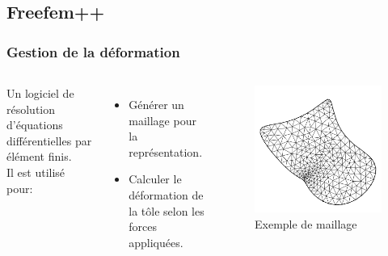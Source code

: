 \documentclass{beamer}
\begin{document}
\subsection{Freefem++}
\begin{frame}
    \frametitle{Gestion de la déformation}
    \begin{columns}
        Un logiciel de résolution d'équations différentielles par élément finis.\\
        Il est utilisé pour:
        \begin{itemize}
            \item Générer un maillage pour la représentation.
            \item Calculer le déformation de la tôle selon les forces appliquées.
        \end{itemize}
        \begin{figure}
            \includegraphics[width=\textwidth]{img/maillage.png}
            \caption{Exemple de maillage}
            \label{Maillage}
        \end{figure}
    \end{columns}
\end{frame}
\end{document}
